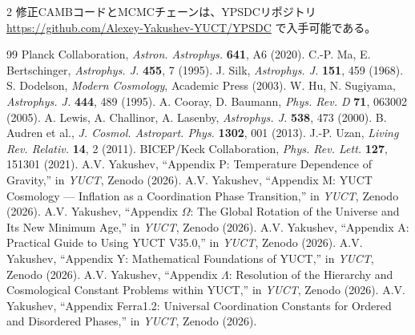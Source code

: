 \documentclass[11pt,a4paper]{article}
\begin{document}
\begin{multicols}{2}
		修正CAMBコードとMCMCチェーンは、YPSDCリポジトリ \url{https://github.com/Alexey-Yakushev-YUCT/YPSDC} で入手可能である。
		
		\begin{thebibliography}{99}
			 Planck Collaboration, \emph{Astron. Astrophys.} \textbf{641}, A6 (2020).
			 C.-P. Ma, E. Bertschinger, \emph{Astrophys. J.} \textbf{455}, 7 (1995).
			 J. Silk, \emph{Astrophys. J.} \textbf{151}, 459 (1968).
			 S. Dodelson, \emph{Modern Cosmology}, Academic Press (2003).
			 W. Hu, N. Sugiyama, \emph{Astrophys. J.} \textbf{444}, 489 (1995).
			 A. Cooray, D. Baumann, \emph{Phys. Rev. D} \textbf{71}, 063002 (2005).
			 A. Lewis, A. Challinor, A. Lasenby, \emph{Astrophys. J.} \textbf{538}, 473 (2000).
			 B. Audren et al., \emph{J. Cosmol. Astropart. Phys.} \textbf{1302}, 001 (2013).
			 J.-P. Uzan, \emph{Living Rev. Relativ.} \textbf{14}, 2 (2011).
			 BICEP/Keck Collaboration, \emph{Phys. Rev. Lett.} \textbf{127}, 151301 (2021).
			 A.V. Yakushev, ``Appendix P: Temperature Dependence of Gravity,'' in \emph{YUCT}, Zenodo (2026).
			 A.V. Yakushev, ``Appendix M: YUCT Cosmology — Inflation as a Coordination Phase Transition,'' in \emph{YUCT}, Zenodo (2026).
			 A.V. Yakushev, ``Appendix $\Omega$: The Global Rotation of the Universe and Its New Minimum Age,'' in \emph{YUCT}, Zenodo (2026).
			 A.V. Yakushev, ``Appendix A: Practical Guide to Using YUCT V35.0,'' in \emph{YUCT}, Zenodo (2026).
			 A.V. Yakushev, ``Appendix Y: Mathematical Foundations of YUCT,'' in \emph{YUCT}, Zenodo (2026).
			 A.V. Yakushev, ``Appendix $\Lambda$: Resolution of the Hierarchy and Cosmological Constant Problems within YUCT,'' in \emph{YUCT}, Zenodo (2026).
			 A.V. Yakushev, ``Appendix Ferra1.2: Universal Coordination Constants for Ordered and Disordered Phases,'' in \emph{YUCT}, Zenodo (2026).
		\end{thebibliography}
		
	\end{multicols}
\end{document}
